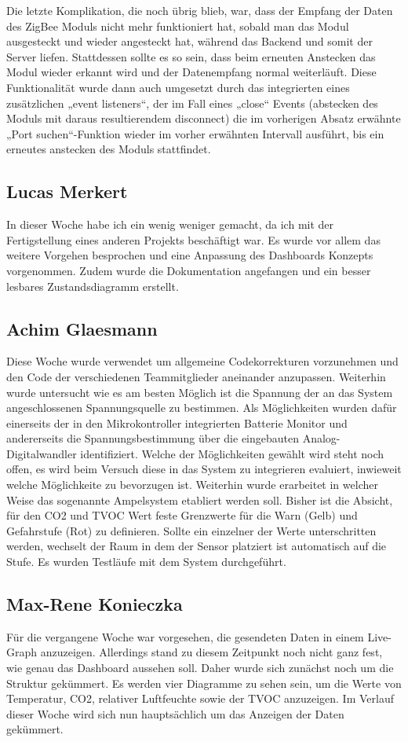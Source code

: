 \documentclass[]{article}
\begin{document}
Die letzte Komplikation, die noch übrig blieb, war, dass der Empfang der Daten des ZigBee Moduls nicht mehr funktioniert hat, sobald man das Modul ausgesteckt und wieder angesteckt hat, während das Backend und somit der Server liefen. Stattdessen sollte es so sein, dass beim erneuten Anstecken das Modul wieder erkannt wird und der Datenempfang normal weiterläuft. Diese Funktionalität wurde dann auch umgesetzt durch das integrierten eines zusätzlichen „event listeners“, der im Fall eines „close“ Events (abstecken des Moduls mit daraus resultierendem disconnect) die im vorherigen Absatz erwähnte „Port suchen“-Funktion wieder im vorher erwähnten Intervall ausführt, bis ein erneutes anstecken des Moduls stattfindet.


\subsection{Lucas Merkert}
In dieser Woche habe ich ein wenig weniger gemacht, da ich mit der Fertigstellung eines anderen Projekts beschäftigt war. Es wurde vor allem das weitere Vorgehen besprochen und eine Anpassung des Dashboards Konzepts vorgenommen. Zudem wurde die Dokumentation angefangen und ein besser lesbares Zustandsdiagramm erstellt.

\subsection{Achim Glaesmann}
Diese Woche wurde verwendet um allgemeine Codekorrekturen vorzunehmen und den Code der verschiedenen Teammitglieder aneinander anzupassen. Weiterhin wurde untersucht wie es am besten Möglich ist die Spannung der an das System angeschlossenen Spannungsquelle zu bestimmen. Als Möglichkeiten wurden dafür einerseits der in den Mikrokontroller integrierten Batterie Monitor und andererseits die Spannungsbestimmung über die eingebauten Analog-Digitalwandler identifiziert. Welche der Möglichkeiten gewählt wird steht noch offen, es wird beim Versuch diese in das System zu integrieren evaluiert, inwieweit welche Möglichkeite zu bevorzugen ist. Weiterhin wurde erarbeitet in welcher Weise das sogenannte Ampelsystem etabliert werden soll. Bisher ist die Absicht, für den CO2 und TVOC Wert feste Grenzwerte für die Warn (Gelb) und Gefahrstufe (Rot) zu definieren. Sollte ein einzelner der Werte unterschritten werden, wechselt der Raum in dem der Sensor platziert ist automatisch auf die Stufe. Es wurden Testläufe mit dem System durchgeführt.

\subsection{Max-Rene Konieczka}
Für die vergangene Woche war vorgesehen, die gesendeten Daten in einem Live-Graph anzuzeigen. Allerdings stand zu diesem Zeitpunkt noch nicht ganz fest, wie genau das Dashboard aussehen soll. Daher wurde sich zunächst noch um die Struktur gekümmert. Es werden vier Diagramme zu sehen sein, um die Werte von Temperatur, CO2, relativer Luftfeuchte sowie der TVOC anzuzeigen. Im Verlauf dieser Woche wird sich nun hauptsächlich um das Anzeigen der Daten gekümmert. 
\end{document}

